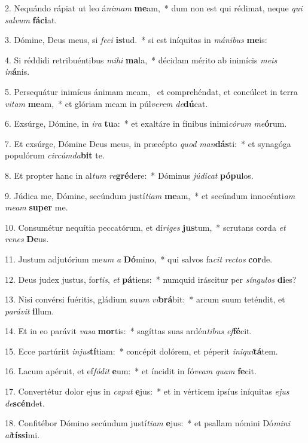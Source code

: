 2. Nequándo rápiat ut leo á\textit{ni}\textit{mam} \textbf{me}am,~*  dum non est qui rédimat, neque \textit{qui} \textit{sal}\textit{vum} \textbf{fá}\textbf{ci}at.\

3. Dómine, Deus meus, si \textit{fe}\textit{ci} \textbf{is}tud.~*  si est iníquitas in \textit{má}\textit{ni}\textit{bus} \textbf{me}is:\

4. Si réddidi retribuéntibus \textit{mi}\textit{hi} \textbf{ma}la,~*  décidam mérito ab inimícis \textit{me}\textit{is} \textit{in}\textbf{á}nis.\

5. Persequátur inimícus ánimam meam, \dag\  et comprehéndat, et concúlcet in terra \textit{vi}\textit{tam} \textbf{me}am,~*  et glóriam meam in púl\textit{ve}\textit{rem} \textit{de}\textbf{dú}cat.\

6. Exsúrge, Dómine, in \textit{i}\textit{ra} \textbf{tu}a:~*  et exaltáre in fínibus inimi\textit{có}\textit{rum} \textit{me}\textbf{ó}rum.\

7. Et exsúrge, Dómine Deus meus, in præcépto \textit{quod} \textit{man}\textbf{dás}ti:~*  et synagóga populórum \textit{cir}\textit{cúm}\textit{da}\textbf{bit} te.\

8. Et propter hanc in al\textit{tum} \textit{re}\textbf{gré}dere:~*  Dóminus \textit{jú}\textit{di}\textit{cat} \textbf{pó}\textbf{pu}los.\

9. Júdica me, Dómine, secúndum justí\textit{ti}\textit{am} \textbf{me}am,~*  et secúndum innocénti\textit{am} \textit{me}\textit{am} \textbf{su}\textbf{per} me.\

10. Consumétur nequítia peccatórum, et dí\textit{ri}\textit{ges} \textbf{jus}tum,~*  scrutans corda \textit{et} \textit{re}\textit{nes} \textbf{De}us.\

11. Justum adjutórium me\textit{um} \textit{a} \textbf{Dó}mino,~*  qui salvos fa\textit{cit} \textit{rec}\textit{tos} \textbf{cor}de.\

12. Deus judex justus, for\textit{tis}, \textit{et} \textbf{pá}tiens:~*  numquid iráscitur per \textit{sín}\textit{gu}\textit{los} \textbf{di}es?\

13. Nisi convérsi fuéritis, gládium su\textit{um} \textit{vi}\textbf{brá}bit:~*  arcum suum teténdit, et \textit{pa}\textit{rá}\textit{vit} \textbf{il}lum.\

14. Et in eo parávit \textit{va}\textit{sa} \textbf{mor}tis:~*  sagíttas suas ardén\textit{ti}\textit{bus} \textit{ef}\textbf{fé}cit.\

15. Ecce partúriit \textit{in}\textit{jus}\textbf{tí}tiam:~*  concépit dolórem, et péperit \textit{in}\textit{i}\textit{qui}\textbf{tá}tem.\

16. Lacum apéruit, et ef\textit{fó}\textit{dit} \textbf{e}um:~*  et íncidit in fó\textit{ve}\textit{am} \textit{quam} \textbf{fe}cit.\

17. Convertétur dolor ejus in \textit{ca}\textit{put} \textbf{e}jus:~*  et in vérticem ipsíus iníquitas \textit{e}\textit{jus} \textit{de}\textbf{scén}det.\

18. Confitébor Dómino secúndum justí\textit{ti}\textit{am} \textbf{e}jus:~*  et psallam nómini Dó\textit{mi}\textit{ni} \textit{al}\textbf{tís}\textbf{si}mi.\

